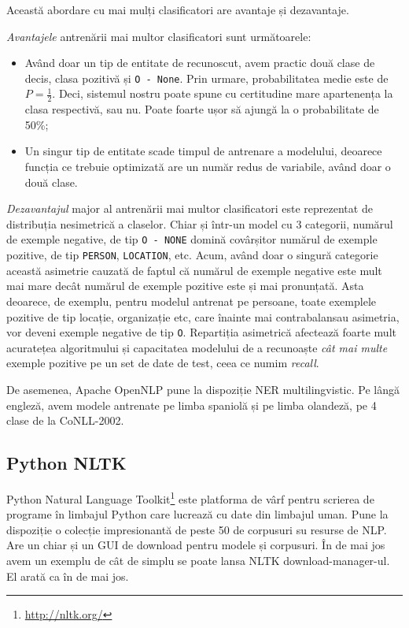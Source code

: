 Această abordare cu mai mulți clasificatori are avantaje și dezavantaje.

\textit{Avantajele} antrenării mai multor clasificatori sunt următoarele:

\begin{itemize}
	\item Având doar un tip de entitate de recunoscut, avem practic două clase de decis, clasa pozitivă și \texttt{O - None}. Prin urmare, probabilitatea medie este de $P = \frac{1}{2} $. Deci, sistemul nostru poate spune cu certitudine mare apartenența la clasa respectivă, sau nu. Poate foarte ușor să ajungă la o probabilitate de 50\%;
	\item Un singur tip de entitate scade timpul de antrenare a modelului, deoarece funcția ce trebuie optimizată are un număr redus de variabile, având doar o două clase.
\end{itemize}

\textit{Dezavantajul} major al antrenării mai multor clasificatori este reprezentat de distribuția nesimetrică a claselor. Chiar și într-un model cu 3 categorii, numărul de exemple negative, de tip \texttt{O - NONE} domină covârșitor numărul de exemple pozitive, de tip \texttt{PERSON}, \texttt{LOCATION}, etc. Acum, având doar o singură categorie această asimetrie cauzată de faptul că numărul de exemple negative este mult mai mare decât numărul de exemple pozitive este și mai pronunțată. Asta deoarece, de exemplu, pentru modelul antrenat pe persoane, toate exemplele pozitive de tip locație, organizație etc, care înainte mai contrabalansau asimetria, vor deveni exemple negative de tip \texttt{O}. Repartiția asimetrică afectează foarte mult acuratețea algoritmului și capacitatea modelului de a recunoaște \textit{cât mai multe} exemple pozitive pe un set de date de test, ceea ce numim \textit{recall}.

De asemenea, Apache OpenNLP pune la dispoziție NER multilingvistic. Pe lângă engleză, avem modele antrenate pe limba spaniolă și pe limba olandeză, pe 4 clase de la CoNLL-2002.

\subsection{Python NLTK}

Python Natural Language Toolkit\footnote{\url{http://nltk.org/}} este platforma de vârf pentru scrierea de programe în limbajul Python care lucrează cu date din limbajul uman. Pune la dispoziție  o colecție impresionantă de peste 50 de corpusuri su resurse de NLP. Are un chiar și un GUI de download pentru modele și corpusuri. În  de mai jos avem un exemplu de cât de simplu se poate lansa NLTK download-manager-ul. El arată ca în  de mai jos.

